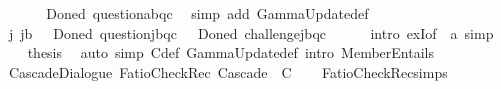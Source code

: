 \begin{isabellebody}
%
\isadelimproof
%
\endisadelimproof
%
\isatagproof
{}\isamarkupfalse%
\ {\isacharminus}{\kern0pt}\isanewline
\ \ \isamarkupfalse%
\ {\isachardoublequoteopen}{\isasymDelta}\ {\isacharparenleft}{\kern0pt}Done\isactrlsup d\ question{\isacharbrackleft}{\kern0pt}a{\isacharcomma}{\kern0pt}b{\isacharcomma}{\kern0pt}q\isactrlsup c{\isacharbrackright}{\kern0pt}{\isacharparenright}{\kern0pt}{\isachardoublequoteclose}\ \isamarkupfalse%
\ {\isacharparenleft}{\kern0pt}simp\ add{\isacharcolon}{\kern0pt}\ GammaUpdate{\isacharunderscore}{\kern0pt}def{\isacharparenright}{\kern0pt}\isanewline
\ \ \isamarkupfalse%
\ {\isachardoublequoteopen}{\isasymexists}j{\isachardot}{\kern0pt}\ j{\isasymnoteq}b\ {\isasymand}\ {\isacharparenleft}{\kern0pt}{\isasymDelta}\ {\isacharparenleft}{\kern0pt}Done\isactrlsup d\ question{\isacharbrackleft}{\kern0pt}j{\isacharcomma}{\kern0pt}b{\isacharcomma}{\kern0pt}q\isactrlsup c{\isacharbrackright}{\kern0pt}{\isacharparenright}{\kern0pt}\ {\isasymor}\ {\isasymDelta}\ {\isacharparenleft}{\kern0pt}Done\isactrlsup d\ challenge{\isacharbrackleft}{\kern0pt}j{\isacharcomma}{\kern0pt}b{\isacharcomma}{\kern0pt}q\isactrlsup c{\isacharbrackright}{\kern0pt}{\isacharparenright}{\kern0pt}{\isacharparenright}{\kern0pt}{\isachardoublequoteclose}\isanewline
\ \ \ \ \isamarkupfalse%
\ {\isacharparenleft}{\kern0pt}intro\ exI{\isacharbrackleft}{\kern0pt}of\ {\isacharunderscore}{\kern0pt}\ a{\isacharbrackright}{\kern0pt}{\isacharparenright}{\kern0pt}\ simp\isanewline
\ \ \isamarkupfalse%
\ {\isacharquery}{\kern0pt}thesis\ \isamarkupfalse%
\ {\isacharparenleft}{\kern0pt}auto\ simp{\isacharcolon}{\kern0pt}\ {\isasymGamma}\isactrlsub C{\isacharunderscore}{\kern0pt}def\ GammaUpdate{\isacharunderscore}{\kern0pt}def\ intro{\isacharbang}{\kern0pt}{\isacharcolon}{\kern0pt}\ MemberEntails{\isacharparenright}{\kern0pt}\isanewline
{}\isamarkupfalse%
%
\endisatagproof
{\isafoldproof}%
%
\isadelimproof
\isanewline
%
\endisadelimproof
\isanewline
{}\isamarkupfalse%
\ CascadeDialogue{\isacharcolon}{\kern0pt}\ {\isachardoublequoteopen}FatioCheckRec\ Cascade\ {\isacharbrackleft}{\kern0pt}{\isacharbrackright}{\kern0pt}\ {\isasymGamma}\isactrlsub C{\isachardoublequoteclose}\isanewline
%
\isadelimproof
\ \ %
\endisadelimproof
%
\isatagproof
{}\isamarkupfalse%
\ FatioCheckRec{\isachardot}{\kern0pt}simps\isanewline
\ \ \isamarkupfalse%

\end{isabellebody}
